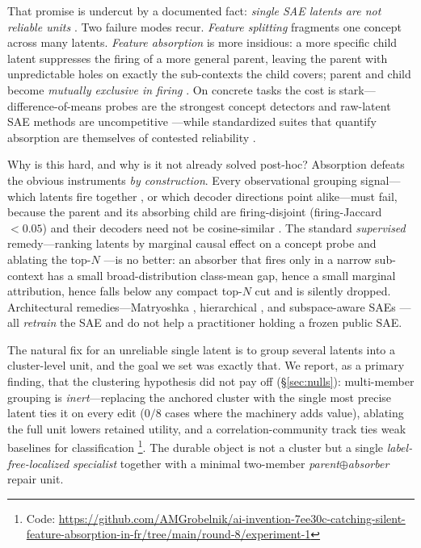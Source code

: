 \documentclass[11pt,letterpaper]{article}
\begin{document}
That promise is undercut by a documented fact: \emph{single SAE latents are not reliable units} \citep{Leask2025}. Two failure modes recur. \emph{Feature splitting} fragments one concept across many latents. \emph{Feature absorption} is more insidious: a more specific child latent suppresses the firing of a more general parent, leaving the parent with unpredictable holes on exactly the sub-contexts the child covers; parent and child become \emph{mutually exclusive in firing} \citep{Chanin2024}. On concrete tasks the cost is stark---difference-of-means probes are the strongest concept detectors and raw-latent SAE methods are uncompetitive \citep{Wu2025, Kantamneni2025}---while standardized suites that quantify absorption are themselves of contested reliability \citep{Karvonen2025, Chanin2026}.

Why is this hard, and why is it not already solved post-hoc? Absorption defeats the obvious instruments \emph{by construction}. Every observational grouping signal---which latents fire together \citep{ONeill2024, Deng2025}, or which decoder directions point alike---must fail, because the parent and its absorbing child are firing-disjoint (firing-Jaccard $<0.05$) and their decoders need not be cosine-similar \citep{Chanin2024}. The standard \emph{supervised} remedy---ranking latents by marginal causal effect on a concept probe and ablating the top-$N$ \citep{Karvonen2024, Marks2024}---is no better: an absorber that fires only in a narrow sub-context has a small broad-distribution class-mean gap, hence a small marginal attribution, hence falls below any compact top-$N$ cut and is silently dropped. Architectural remedies---Matryoshka \citep{Bussmann2025}, hierarchical \citep{Muchane2025}, and subspace-aware SAEs \citep{Dalili2026}---all \emph{retrain} the SAE and do not help a practitioner holding a frozen public SAE.

The natural fix for an unreliable single latent is to group several latents into a cluster-level unit, and the goal we set was exactly that. We report, as a primary finding, that the clustering hypothesis did not pay off (\S\ref{sec:nulls}): multi-member grouping is \emph{inert}---replacing the anchored cluster with the single most precise latent ties it on every edit ($0/8$ cases where the machinery adds value), ablating the full unit lowers retained utility, and a correlation-community track ties weak baselines for classification \footnote{Code: \url{https://github.com/AMGrobelnik/ai-invention-7ee30c-catching-silent-feature-absorption-in-fr/tree/main/round-8/experiment-1}}. The durable object is not a cluster but a single \emph{label-free-localized specialist} together with a minimal two-member \emph{parent$\oplus$absorber} repair unit.
\end{document}
